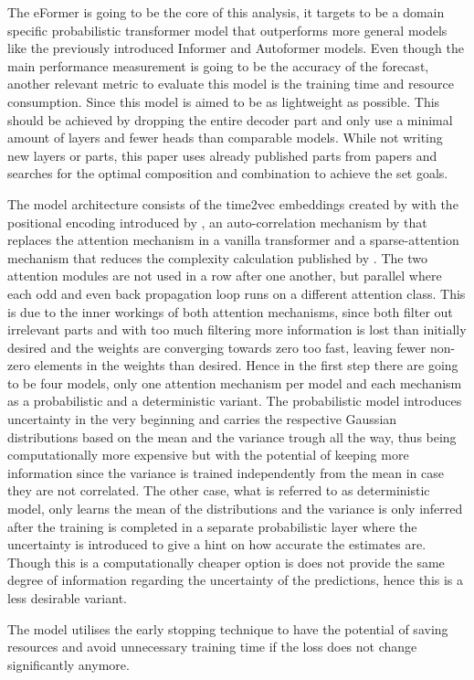 \documentclass{article}
\begin{document}
The eFormer is going to be the core of this analysis, it targets to be a domain specific probabilistic transformer model that outperforms more general models like the previously introduced Informer and Autoformer models. Even though the main performance measurement is going to be the accuracy of the forecast, another relevant metric to evaluate this model is the training time and resource consumption. Since this model is aimed to be as lightweight as possible. This should be achieved by dropping the entire decoder part and only use a minimal amount of layers and fewer heads than comparable models. While not writing new layers or parts, this paper uses already published parts from papers and searches for the optimal composition and combination to achieve the set goals. \par
The model architecture consists of the time2vec embeddings created by \cite{time2vec} with the positional encoding introduced by \cite{vanilla-transformer}, an auto-correlation mechanism by \cite{autoformer} that replaces the attention mechanism in a vanilla transformer and a sparse-attention mechanism that reduces the complexity calculation published by \cite{Informer}. The two attention modules are not used in a row after one another, but parallel where each odd and even back propagation loop runs on a different attention class. This is due to the inner workings of both attention mechanisms, since both filter out irrelevant parts and with too much filtering more information is lost than initially desired and the weights are converging towards zero too fast, leaving fewer non-zero elements in the weights than desired. Hence in the first step there are going to be four models, only one attention mechanism per model and each mechanism as a probabilistic and a deterministic variant. The probabilistic model introduces uncertainty in the very beginning and carries the respective Gaussian distributions based on the mean and the variance trough all the way, thus being computationally more expensive but with the potential of keeping more information since the variance is trained independently from the mean in case they are not correlated. The other case, what is referred to as deterministic model, only learns the mean of the distributions and the variance is only inferred after the training is completed in a separate probabilistic layer where the uncertainty is introduced to give a hint on how accurate the estimates are. Though this is a computationally cheaper option is does not provide the same degree of information regarding the uncertainty of the predictions, hence this is a less desirable variant. \par 
The model utilises the early stopping technique to have the potential of saving resources and avoid unnecessary training time if the loss does not change significantly anymore. 
\end{document}
